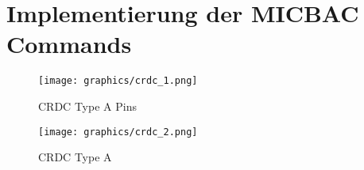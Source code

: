\chapter{Implementierung der MICBAC Commands}
\label{ch:micbac}


\begin{figure}[H]
	\begin{minipage}{0.5\textwidth}
		\centering
		\texttt{[image: graphics/crdc\_1.png]}
		\caption{CRDC Type A Pins}
		\label{fig:crdc-pins}
	\end{minipage}
	\begin{minipage}{0.5\textwidth}
		\centering
		\texttt{[image: graphics/crdc\_2.png]}
		\caption{CRDC Type A}
		\label{fig:crdc_top}
	\end{minipage}
\end{figure}